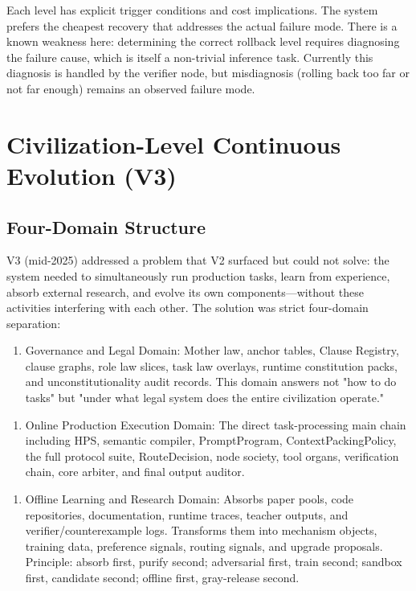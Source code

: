 \documentclass[12pt,a4paper]{article}
\begin{document}
Each level has explicit trigger conditions and cost implications. The system prefers the cheapest recovery that addresses the actual failure mode. There is a known weakness here: determining the correct rollback level requires diagnosing the failure cause, which is itself a non-trivial inference task. Currently this diagnosis is handled by the verifier node, but misdiagnosis (rolling back too far or not far enough) remains an observed failure mode.

\section{Civilization-Level Continuous Evolution (V3)}


\subsection{Four-Domain Structure}


V3 (mid-2025) addressed a problem that V2 surfaced but could not solve: the system needed to simultaneously run production tasks, learn from experience, absorb external research, and evolve its own components---without these activities interfering with each other. The solution was strict four-domain separation:

\begin{enumerate}
  \item Governance and Legal Domain: Mother law, anchor tables, Clause Registry, clause graphs, role law slices, task law overlays, runtime constitution packs, and unconstitutionality audit records. This domain answers not "how to do tasks" but "under what legal system does the entire civilization operate."
\end{enumerate}

\begin{enumerate}
  \item Online Production Execution Domain: The direct task-processing main chain including HPS, semantic compiler, PromptProgram, ContextPackingPolicy, the full protocol suite, RouteDecision, node society, tool organs, verification chain, core arbiter, and final output auditor.
\end{enumerate}

\begin{enumerate}
  \item Offline Learning and Research Domain: Absorbs paper pools, code repositories, documentation, runtime traces, teacher outputs, and verifier/counterexample logs. Transforms them into mechanism objects, training data, preference signals, routing signals, and upgrade proposals. Principle: absorb first, purify second; adversarial first, train second; sandbox first, candidate second; offline first, gray-release second.
\end{enumerate}
\end{document}
